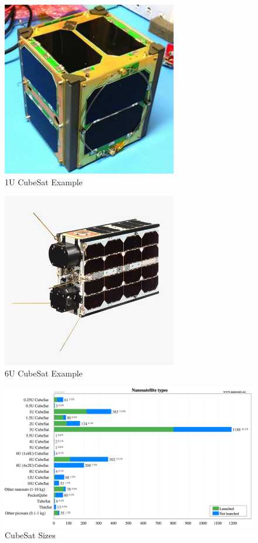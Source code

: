 \begin{figure}[H]
    \centering
    \includegraphics[width=3in]{Thesis/Literature_Review/Lit Review Figures/vanderbiltcubesat.jpg}
    \caption{1U CubeSat Example}
    \label{fig:1U CubeSat Example}
\end{figure}

\begin{figure}[H]
    \centering
    \includegraphics[width=3in]{Thesis/Literature_Review/Lit Review Figures/6Ucubesatbus.jpg}
    \caption{6U CubeSat Example}
    \label{fig:6U CubeSat Example}
\end{figure}

\begin{figure}[H]
    \centering
    \includegraphics[width=\textwidth]{Thesis/Literature_Review/Lit Review Figures/CubeSat Sizes.png}
    \caption{CubeSat Sizes}
    \label{fig:CubeSat Sizes}
\end{figure}

